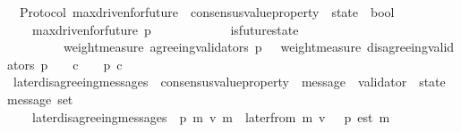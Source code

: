 \begin{isabellebody}
\isanewline
{}\isamarkupfalse%
\ {\isacharparenleft}\ Protocol{\isacharparenright}\ max{\isacharunderscore}driven{\isacharunderscore}for{\isacharunderscore}future\ {\isacharcolon}{\isacharcolon}\ {\isachardoublequoteopen}consensus{\isacharunderscore}value{\isacharunderscore}property\ {\isasymRightarrow}\ state\ {\isasymRightarrow}\ bool{\isachardoublequoteclose}\isanewline
\ \ \isanewline
\ \ \ \ {\isachardoublequoteopen}max{\isacharunderscore}driven{\isacharunderscore}for{\isacharunderscore}future\ p\ {\isasymsigma}\ {\isacharequal}\isanewline
\ \ \ \ \ \ {\isacharparenleft}{\isasymforall}\ {\isasymsigma}{\isacharprime}\ {\isasymin}\ {\isasymSigma}{\isachardot}\ is{\isacharunderscore}future{\isacharunderscore}state\ {\isacharparenleft}{\isasymsigma}{\isacharcomma}\ {\isasymsigma}{\isacharprime}{\isacharparenright}\ \isanewline
\ \ \ \ \ \ \ \ {\isasymlongrightarrow}\ weight{\isacharunderscore}measure\ {\isacharparenleft}agreeing{\isacharunderscore}validators\ {\isacharparenleft}p{\isacharcomma}\ {\isasymsigma}{\isacharprime}{\isacharparenright}{\isacharparenright}\ {\isachargreater}\ weight{\isacharunderscore}measure\ {\isacharparenleft}disagreeing{\isacharunderscore}validators\ {\isacharparenleft}p{\isacharcomma}\ {\isasymsigma}{\isacharprime}{\isacharparenright}{\isacharparenright}\ {\isasymlongrightarrow}\ {\isacharparenleft}{\isasymforall}\ c\ {\isasymin}\ {\isasymepsilon}\ {\isasymsigma}{\isacharprime}{\isachardot}\ p\ c{\isacharparenright}{\isacharparenright}{\isachardoublequoteclose}\isanewline
\isanewline
\isanewline
{}\isamarkupfalse%
\ later{\isacharunderscore}disagreeing{\isacharunderscore}messages\ {\isacharcolon}{\isacharcolon}\ {\isachardoublequoteopen}{\isacharparenleft}consensus{\isacharunderscore}value{\isacharunderscore}property\ {\isacharasterisk}\ message\ {\isacharasterisk}\ validator\ {\isacharasterisk}\ state{\isacharparenright}\ {\isasymRightarrow}\ message\ set{\isachardoublequoteclose}\isanewline
\ \ \ \isanewline
\ \ \ \ {\isachardoublequoteopen}later{\isacharunderscore}disagreeing{\isacharunderscore}messages\ {\isacharequal}\ {\isacharparenleft}{\isasymlambda}{\isacharparenleft}p{\isacharcomma}\ m{\isacharcomma}\ v{\isacharcomma}\ {\isasymsigma}{\isacharparenright}{\isachardot}{\isacharbraceleft}m{\isacharprime}\ {\isasymin}\ later{\isacharunderscore}from\ {\isacharparenleft}m{\isacharcomma}\ v{\isacharcomma}\ {\isasymsigma}{\isacharparenright}{\isachardot}\ {\isasymnot}\ p\ {\isacharparenleft}est\ m{\isacharprime}{\isacharparenright}{\isacharbraceright}{\isacharparenright}{\isachardoublequoteclose}\isanewline

\end{isabellebody}
